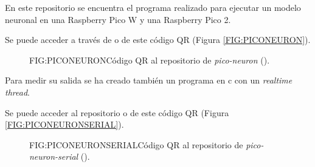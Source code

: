 
En este repositorio se encuentra el programa realizado para ejecutar un modelo neuronal en una Raspberry Pico W y una Raspberry Pico 2. 

Se puede acceder a través de  o de este código QR (Figura \ref{FIG:PICONEURON}).

\begin{figure}[QR repositorio de pico-neuron]{FIG:PICONEURON}{Código QR al repositorio de \textit{pico-neuron} ().
}
\end{figure}


Para medir su salida se ha creado también un programa en c con un \textit{realtime thread}.

Se puede acceder al repositorio  o de este código QR (Figura \ref{FIG:PICONEURONSERIAL}).

\begin{figure}[QR repositorio de pico-neuron-serial]{FIG:PICONEURONSERIAL}{Código QR al repositorio de \textit{pico-neuron-serial} ().
}
\end{figure}


